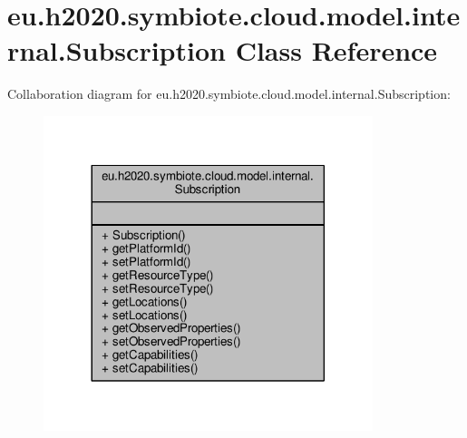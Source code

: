 \hypertarget{classeu_1_1h2020_1_1symbiote_1_1cloud_1_1model_1_1internal_1_1Subscription}{}\section{eu.\+h2020.\+symbiote.\+cloud.\+model.\+internal.\+Subscription Class Reference}
\label{classeu_1_1h2020_1_1symbiote_1_1cloud_1_1model_1_1internal_1_1Subscription}


Collaboration diagram for eu.\+h2020.\+symbiote.\+cloud.\+model.\+internal.\+Subscription\+:\nopagebreak
\begin{figure}[H]
\begin{center}
\leavevmode
\includegraphics[width=272pt]{classeu_1_1h2020_1_1symbiote_1_1cloud_1_1model_1_1internal_1_1Subscription__coll__graph}
\end{center}
\end{figure}
